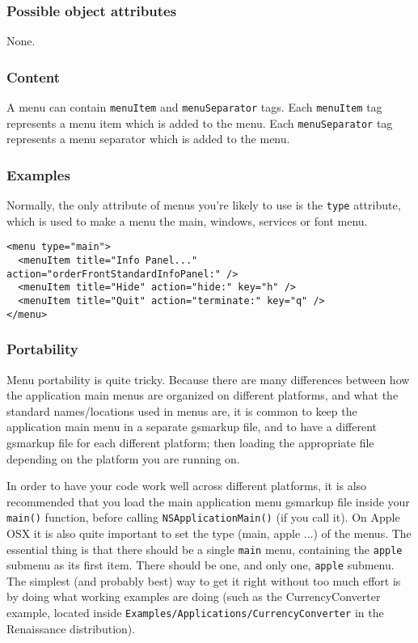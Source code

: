 \subsubsection{Possible object attributes}
None.

\subsubsection{Content}
A menu can contain \texttt{menuItem} and \texttt{menuSeparator} tags.
Each \texttt{menuItem} tag represents a menu item which is added to
the menu.  Each \texttt{menuSeparator} tag represents a menu separator
which is added to the menu.

\subsubsection{Examples}
Normally, the only attribute of menus you're likely to use is the 
\texttt{type} attribute, which is used to make a menu the main, windows, 
services or font menu.
\begin{verbatim}
<menu type="main">
  <menuItem title="Info Panel..." action="orderFrontStandardInfoPanel:" />
  <menuItem title="Hide" action="hide:" key="h" />
  <menuItem title="Quit" action="terminate:" key="q" />
</menu>
\end{verbatim}

\subsubsection{Portability}
Menu portability is quite tricky.  Because there are many differences
between how the application main menus are organized on different
platforms, and what the standard names/locations used in menus are, it
is common to keep the application main menu in a separate gsmarkup
file, and to have a different gsmarkup file for each different
platform; then loading the appropriate file depending on the platform
you are running on.

In order to have your code work well across different platforms, it is
also recommended that you load the main application menu gsmarkup file
inside your \texttt{main()} function, before calling
\texttt{NSApplicationMain()} (if you call it).  On Apple OSX it is
also quite important to set the type (main, apple ...)  of the menus.
The essential thing is that there should be a single \texttt{main}
menu, containing the \texttt{apple} submenu as its first item.  There
should be one, and only one, \texttt{apple} submenu.  The simplest
(and probably best) way to get it right without too much effort is by
doing what working examples are doing (such as the CurrencyConverter
example, located inside
\texttt{Examples/Applications/CurrencyConverter} in the Renaissance
distribution).

